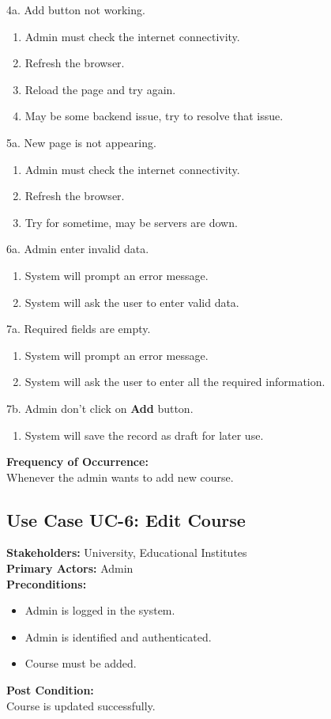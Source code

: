 4a. Add button not working.
\begin{enumerate}
\item Admin must check the internet connectivity.
\item Refresh the browser.
\item Reload the page and try again.
\item May be some backend issue, try to resolve that issue.
\end{enumerate}
5a. New page is not appearing.
\begin{enumerate}
\item Admin must check the internet connectivity.
\item Refresh the browser.
\item Try for sometime, may be servers are down.
\end{enumerate}
6a. Admin enter invalid data.
\begin{enumerate}
\item System will prompt an error message.
\item System will ask the user to enter valid data.
\end{enumerate}
7a. Required fields are empty.
\begin{enumerate}
\item System will prompt an error message.
\item System will ask the user to enter all the required information.
\end{enumerate}
7b. Admin don't click on \textbf{Add} button.
\begin{enumerate}
\item System will save the record as draft for later use.
\end{enumerate}
\textbf{Frequency of Occurrence:}\\
Whenever the admin wants to add new course.



\subsection{Use Case UC-6: Edit Course}
\textbf{Stakeholders: } University, Educational Institutes \\
\textbf{Primary Actors: } Admin \\
\textbf{Preconditions:}
\begin{itemize}
\item Admin is logged in the system.
\item Admin is identified and authenticated.
\item Course must be added.
\end{itemize}
\textbf{Post Condition: }\\
Course is updated successfully.\\

